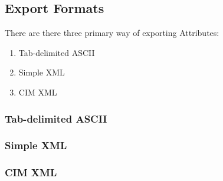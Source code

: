 %

\subsection {Export Formats}

There are there three primary way of exporting Attributes:
\begin{enumerate}
   \item Tab-delimited ASCII
   \item Simple XML 
   \item CIM XML
\end{enumerate}


\subsubsection {Tab-delimited ASCII}


\subsubsection {Simple XML}


\subsubsection {CIM XML}
